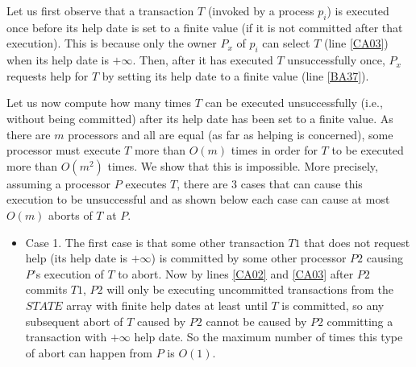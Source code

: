 \begin{proofT}
Let  us first   observe  that a  transaction  $T$  (invoked by  a process
$p_i$)  is executed once before its  help date is  set  to a finite value
(if it is not committed after that execution).
This is  because only the owner $P_x$ of $p_i$ can  select $T$
(line \ref{CA03}) when its help date is  $+\infty$.
Then, after it has  executed $T$ unsuccessfully once, $P_x$  requests
help for $T$ by setting its  help date to a finite value (line \ref{BA37}).

Let us now compute   how many  times $T$  can  be  executed unsuccessfully
(i.e.,  without being committed) after its help date has been  set to a
finite value.
As there  are  $m$   processors and all  are equal (as far as  helping is
concerned),   some  processor must execute $T$  more  than $O(m)$ times
in  order for  $T$  to be  executed more  than $O(m^2)$ times.
We show that this is impossible. More precisely,
assuming  a processor $P$ executes  $T$, there are $3$ cases that can cause
this execution to be unsuccessful  and as shown below
each case can cause at most $O(m)$ aborts of $T$ at $P$.
%
\begin{itemize}

\item
Case 1. The first case  is that some other transaction $T1$ that does
not  request help  (its help date is $+\infty$)  is committed  by some  other
processor $P2$ causing $P$'s execution of $T$ to abort.
Now by lines  \ref{CA02} and \ref{CA03} after $P2$  commits $T1$, $P2$ will
only  be executing  uncommitted transactions  from the  $\mathit{STATE}$
 array with
finite help dates at least until  $T$ is committed, so any subsequent abort
of $T$ caused  by $P2$ cannot be caused by  $P2$ committing a transaction
with $+\infty$ help date.
So the maximum  number of times this  type of abort can happen  from $P$ is
$O(1)$.


\end{itemize}
\end{proofT}
